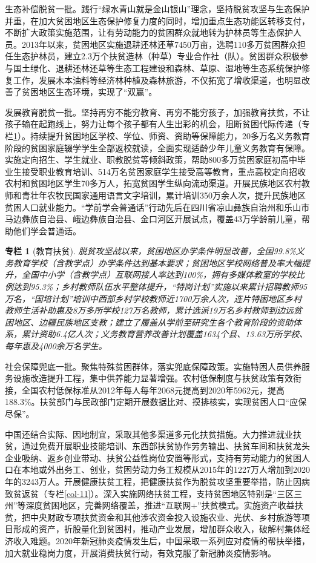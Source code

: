 \documentclass{ctexart}
\newtheorem{zhuanlan}{专栏}
\begin{document}
生态补偿脱贫一批。践行“绿水青山就是金山银山”理念，坚持脱贫攻坚与生态保护并重，在加大贫困地区生态保护修复力度的同时，增加重点生态功能区转移支付，不断扩大政策实施范围，让有劳动能力的贫困群众就地转为护林员等生态保护人员。2013年以来，贫困地区实施退耕还林还草7450万亩，选聘110多万贫困群众担任生态护林员，建立2.3万个扶贫造林（种草）专业合作社（队）。贫困群众积极参与国土绿化、退耕还林还草等生态工程建设和森林、草原、湿地等生态系统保护修复工作，发展木本油料等经济林种植及森林旅游，不仅拓宽了增收渠道，也明显改善了贫困地区生态环境，实现了“双赢”。

发展教育脱贫一批。坚持再穷不能穷教育、再穷不能穷孩子，加强教育扶贫，不让孩子输在起跑线上，努力让每个孩子都有人生出彩的机会，阻断贫困代际传递（专栏\ref{col-10}）。持续提升贫困地区学校、学位、师资、资助等保障能力，20多万名义务教育阶段的贫困家庭辍学学生全部返校就读，全面实现适龄少年儿童义务教育有保障。实施定向招生、学生就业、职教脱贫等倾斜政策，帮助800多万贫困家庭初高中毕业生接受职业教育培训、514万名贫困家庭学生接受高等教育，重点高校定向招收农村和贫困地区学生70多万人，拓宽贫困学生纵向流动渠道。开展民族地区农村教师和青壮年农牧民国家通用语言文字培训，累计培训350万余人次，提升民族地区贫困人口就业能力。“学前学会普通话”行动先后在四川省凉山彝族自治州和乐山市马边彝族自治县、峨边彝族自治县、金口河区开展试点，覆盖43万学龄前儿童，帮助他们学会普通话。

\begin{zhuanlan}[教育扶贫]
    脱贫攻坚战以来，贫困地区办学条件明显改善，全国99.8\%义务教育学校（含教学点）办学条件达到基本要求；贫困地区学校网络普及率大幅提升，全国中小学（含教学点）互联网接人率达到100\%，拥有多媒体教室的学校比例达到95.3\%；乡村教师队伍水平整体提升，“特岗计划”实施以来累计招聘教师95万名，“国培计划”培训中西部乡村学校教师近1700万余人次，连片特困地区乡村教师生活补助惠及8万多所学校127万名教师，累计选派19万名乡村教师到边远贫困地区、边疆民族地区支教；建立了履盖从学前至研究生各个教育阶段的资助体系，累计资助6.4亿人次；义务教育营养改善计划覆盖1634个县、13.63万所学校、每年惠及4000余万名学生。
    \label{col-10}
\end{zhuanlan}

社会保障兜底一批。聚焦特殊贫困群体，落实兜底保障政策。实施特困人员供养服务设施改造提升工程，集中供养能力显著增强。农村低保制度与扶贫政策有效衔接，全国农村低保标准从2012年每人每年2068元提高到2020年5962元，提高188.3\%。扶贫部门与民政部门定期开展数据比对、摸排核实，实现贫困人口“应保尽保”。

中国还结合实际、因地制宜，采取其他多渠道多元化扶贫措施。大力推进就业扶贫，通过免费开展职业技能培训、东西部扶贫协作劳务输出、扶贫车间和扶贫龙头企业吸纳、返乡创业带动、扶贫公益性岗位安置等形式，支持有劳动能力的贫困人口在本地或外出务工、创业，贫困劳动力务工规模从2015年的1227万人增加到2020年的3243万人。开展健康扶贫工程，把健康扶贫作为脱贫攻坚重要举措，防止因病致贫返贫（专栏\ref{col-11}）。深入实施网络扶贫工程，支持贫困地区特别是“三区三州”等深度贫困地区，完善网络覆盖，推进“互联网+”扶贫模式。实施资产收益扶贫，把中央财政专项扶贫资金和其他涉农资金投入设施农业、光伏、乡村旅游等项目形成的资产，折股量化到贫困村，推动产业发展，增加群众收入，破解村集体经济收入难题。2020年新冠肺炎疫情发生后，中国采取一系列应对疫情的帮扶举措，加大就业稳岗力度，开展消费扶贫行动，有效克服了新冠肺炎疫情影响。
\end{document}
